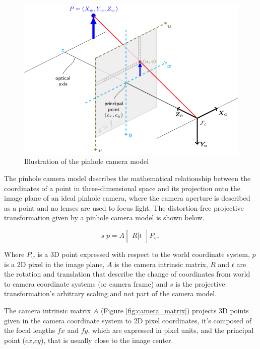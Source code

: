\begin{figure}[h]
  \centering
  \includegraphics[scale=0.3]{figures/pinhole.png}
  \caption{Illustration of the pinhole camera model}
  \label{img:pinhole_img}
\end{figure}

The pinhole camera model describes the mathematical relationship between the coordinates of a point in three-dimensional space and its projection onto the image plane of an ideal pinhole camera, where the camera aperture is described as a point and no lenses are used to focus light\cite{wikipinhole}.
The distortion-free projective transformation given by a pinhole camera model is shown below.

\[s \; p = A \begin{bmatrix} R|t \end{bmatrix} P_w,\]

Where \(P_w\) is a 3D point expressed with respect to the world coordinate system, \(p\) is a 2D pixel in the image plane, \(A\) is the camera intrinsic matrix, \(R\) and \(t\) are the rotation and translation that describe the change of coordinates from world to camera coordinate systems (or camera frame) and \(s\) is the projective transformation's arbitrary scaling and not part of the camera model\cite{opencvcalib}.

The camera intrinsic matrix \(A\) (Figure \ref{fig:camera_matrix}) projects 3D points given in the camera coordinate system to 2D pixel coordinates, it's composed of the focal lengths \(fx\) and \(fy\), which are expressed in pixel units, and the principal point (\(cx\),\(cy\)), that is usually close to the image center\cite{opencvcalib}\cite{888718}.

